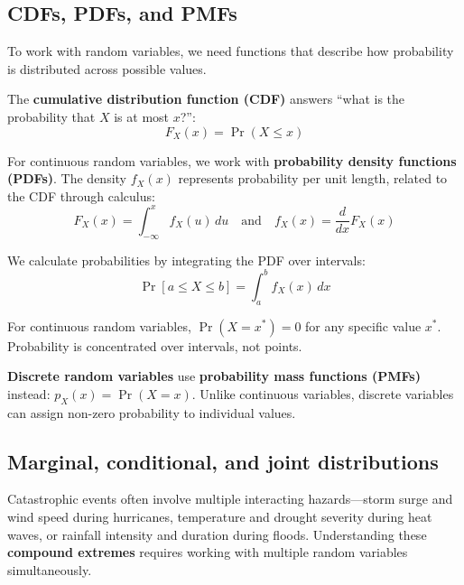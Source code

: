\documentclass[
  letterpaper,
  DIV=11,
  numbers=noendperiod]{scrreprt}
\begin{document}
\subsection{CDFs, PDFs, and PMFs}\label{cdfs-pdfs-and-pmfs}

To work with random variables, we need functions that describe how
probability is distributed across possible values.

The \textbf{cumulative distribution function (CDF)} answers ``what is
the probability that \(X\) is at most \(x\)?'':
\[F_X(x) = \Pr(X \leq x)\]

For continuous random variables, we work with \textbf{probability
density functions (PDFs)}. The density \(f_X(x)\) represents probability
per unit length, related to the CDF through calculus:
\[F_X(x) = \int_{-\infty}^x f_X(u) \, du \quad \text{and} \quad f_X(x) = \frac{d}{dx}F_X(x)\]

We calculate probabilities by integrating the PDF over intervals:
\[\Pr[a \leq X \leq b] = \int_a^b f_X(x) \, dx\]

\begin{tcolorbox}[enhanced jigsaw, arc=.35mm, breakable, title=\textcolor{quarto-callout-important-color}{\faExclamation}\hspace{0.5em}{Important}, coltitle=black, opacityback=0, bottomtitle=1mm, colback=white, left=2mm, opacitybacktitle=0.6, toptitle=1mm, colframe=quarto-callout-important-color-frame, leftrule=.75mm, titlerule=0mm, rightrule=.15mm, bottomrule=.15mm, colbacktitle=quarto-callout-important-color!10!white, toprule=.15mm]

For continuous random variables, \(\Pr(X = x^*) = 0\) for any specific
value \(x^*\). Probability is concentrated over intervals, not points.

\end{tcolorbox}

\textbf{Discrete random variables} use \textbf{probability mass
functions (PMFs)} instead: \(p_X(x) = \Pr(X = x)\). Unlike continuous
variables, discrete variables can assign non-zero probability to
individual values.

\subsection{Marginal, conditional, and joint
distributions}\label{marginal-conditional-and-joint-distributions}

Catastrophic events often involve multiple interacting hazards---storm
surge and wind speed during hurricanes, temperature and drought severity
during heat waves, or rainfall intensity and duration during floods.
Understanding these \textbf{compound extremes} requires working with
multiple random variables simultaneously.
\end{document}
